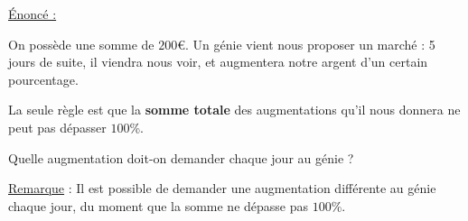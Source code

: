 \documentclass{beamer}
\begin{document}
\begin{frame}
	\uline{Énoncé :} \medskip 
	
	On possède une somme de $200$€. Un génie vient nous proposer un marché : 5 jours de suite, il viendra nous voir, et augmentera notre argent d'un certain pourcentage.

	La seule règle est que la \textbf{somme totale} des augmentations qu'il nous donnera ne peut pas dépasser $100$\%.

	Quelle augmentation doit-on demander chaque jour au génie ? \bigskip
	
	\begin{tcolorbox}
		\uline{Remarque} : Il est possible de demander une augmentation différente au génie chaque jour, du moment que la somme ne dépasse pas $100$\%.
	\end{tcolorbox}
\end{frame}
\end{document}
